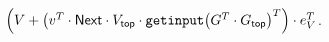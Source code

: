 $\Bigl(V + \bigl( v^T \cdot \mathsf{Next}\cdot V_{\mathsf{top}} \cdot \texttt{getinput}\bigl(G^T\cdot G_{\mathsf{top}}\bigr)^T\Bigr)\cdot e_V^T$.


 


